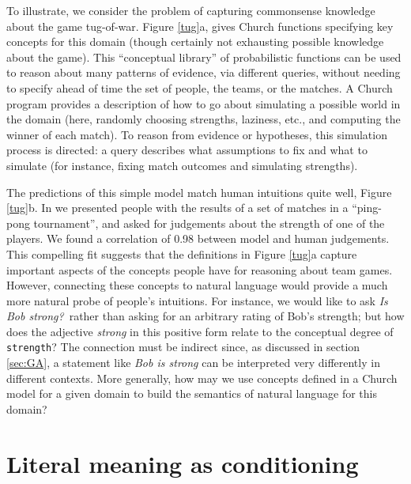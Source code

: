\documentclass[12pt]{article}
\newcounter{definition}
\begin{document}
To illustrate, we consider the problem of capturing commonsense knowledge about the game tug-of-war. Figure \ref{tug}a, gives Church functions specifying key concepts for this domain (though certainly not exhausting possible knowledge about the game). This ``conceptual library'' of probabilistic functions can be used to reason about many patterns of evidence, via different queries, without needing to specify ahead of time the set of people, the teams, or the matches. 
A Church program provides a description of how to go about simulating a possible world in the domain (here, randomly choosing strengths, laziness, etc., and computing the winner of each match). To reason from evidence or hypotheses, this simulation process is directed: a query describes what assumptions to fix and what to simulate (for instance, fixing match outcomes and simulating strengths). 

The predictions of this simple model match human intuitions quite well, Figure \ref{tug}b. In \cite{gerstenberg2012} we presented people with the results of a set of matches in a ``ping-pong tournament'', and asked for judgements about the strength of one of the players.
We found a correlation of 0.98 between model and human judgements. This compelling fit suggests that the definitions in Figure \ref{tug}a capture important aspects of the concepts people have for reasoning about team games. However, connecting these concepts to natural language would provide a much more natural probe of people's intuitions. For instance, we would like to ask \emph{Is Bob strong?}~rather than asking for an arbitrary rating of Bob's strength; but how does the adjective \emph{strong} in this positive form relate to the conceptual degree of \lstinline{strength}? The connection must be indirect since, as discussed in section \ref{sec:GA}, a statement like \emph{Bob is strong} can be interpreted very differently in different contexts.
More generally, how may we use concepts defined in a Church model for a given domain to build the semantics of natural language for this domain?
 




\section{Literal meaning as conditioning}
\label{L0}
\end{document}
